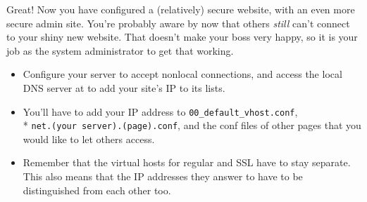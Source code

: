 \documentclass[11pt]{article}
\begin{document}
Great! Now you have configured a (relatively) secure website, with an even more secure admin site. You're probably aware by now that others \emph{still} can't connect to your shiny new website. That doesn't make your boss very happy, so it is your job as the system administrator to get that working.

\begin{itemize}
	  \item Configure your server to accept nonlocal connections, and access the local DNS server at %
      to add your site's IP to its lists.
      \item You'll have to add your IP address to \verb|00_default_vhost.conf|, 
      \\* \verb|net.(your server).(page).conf|, and the conf files of other pages that you would like to let others access.
      \item Remember that the virtual hosts for regular and SSL have to stay separate. This also means that the IP addresses they answer to have to be distinguished from each other too.
\end{itemize}
\end{document}

